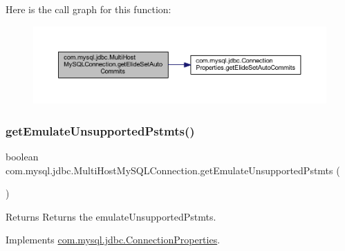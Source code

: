 Here is the call graph for this function\+:
\nopagebreak
\begin{figure}[H]
\begin{center}
\leavevmode
\includegraphics[width=350pt]{classcom_1_1mysql_1_1jdbc_1_1_multi_host_my_s_q_l_connection_a78b0a4ac4834370a985b18fd5f0d35a2_cgraph}
\end{center}
\end{figure}
\mbox{\label{classcom_1_1mysql_1_1jdbc_1_1_multi_host_my_s_q_l_connection_a5c70d20e73b7ab4a471129a0f3c194fe}} 
\subsubsection{\texorpdfstring{get\+Emulate\+Unsupported\+Pstmts()}{getEmulateUnsupportedPstmts()}}
{\footnotesize\ttfamily boolean com.\+mysql.\+jdbc.\+Multi\+Host\+My\+S\+Q\+L\+Connection.\+get\+Emulate\+Unsupported\+Pstmts (\begin{DoxyParamCaption}{ }\end{DoxyParamCaption})}

\begin{DoxyReturn}{Returns}
Returns the emulate\+Unsupported\+Pstmts. 
\end{DoxyReturn}


Implements \mbox{\hyperlink{interfacecom_1_1mysql_1_1jdbc_1_1_connection_properties_ac13c3eab30955ea55dcf84333aeb730f}{com.\+mysql.\+jdbc.\+Connection\+Properties}}.

